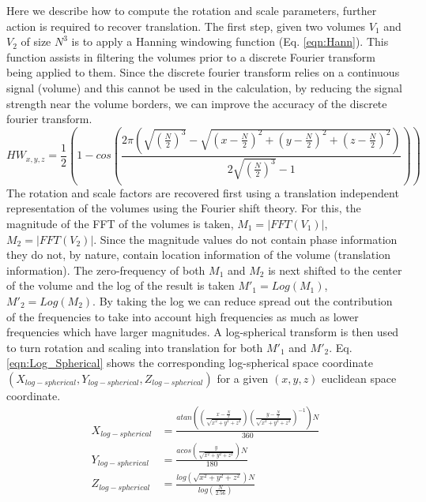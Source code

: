 Here we describe how to compute the rotation and scale parameters, further action is required to recover translation. The first step, given two volumes $V_1$ and $V_2$ of size $N^3$ is to apply a Hanning windowing function (Eq. \ref{eqn:Hann}). This function assists in filtering the volumes prior to a discrete Fourier transform being applied to them. Since the discrete fourier transform relies on a continuous signal (volume) and this cannot be used in the calculation, by reducing the signal strength near the volume borders, we can improve the accuracy of the discrete fourier transform.
\begin{equation} \label{eqn:Hann}
\scriptstyle
HW_{x,y,z} = \frac{1}{2}\left(
1 - cos \left(
\frac{2\pi
\left(
\sqrt{\left(\frac{N}{2}\right)^3} -
\sqrt{
\left(x-\frac{N}{2}\right)^2 + \left(y-\frac{N}{2}\right)^2 + \left(z-\frac{N}{2}\right)^2
}
\right)
}
{2\sqrt{\left(\frac{N}{2}\right)^3} - 1}
\right)
\right)
\end{equation}
The rotation and scale factors are recovered first using a translation independent representation of the volumes using the Fourier shift theory. For this, the magnitude of the FFT of the volumes is taken, $M_1 = |FFT(V_1)|$, $M_2 = |FFT(V_2)|$. Since the magnitude values do not contain phase information they do not, by nature, contain location information of the volume (translation information). The zero-frequency of both $M_1$ and $M_2$ is next shifted to the center of the volume and the log of the result is taken $M'_1 = Log(M_1)$, $M'_2 = Log(M_2)$. By taking the log we can reduce spread out the contribution of the frequencies to take into account high frequencies as much as lower frequencies which have larger magnitudes. A log-spherical transform is then used to turn rotation and scaling into translation for both $M'_1$ and $M'_2$. Eq. \ref{eqn:Log_Spherical} shows the corresponding log-spherical space coordinate $(X_{log-spherical}, Y_{log-spherical}, Z_{log-spherical})$ for a given $(x,y,z)$ euclidean space coordinate.
\begin{equation} \label{eqn:Log_Spherical}
\begin{split}
X_{log-spherical} & = \frac{atan\left(
\left(\frac{x-\frac{N}{2}}{\sqrt{x^2+y^2+z^2}}\right)
\left(\frac{y-\frac{N}{2}}{\sqrt{x^2+y^2+z^2}}\right)^{-1}
\right)N}{360}\\
Y_{log-spherical} & = \frac{acos\left(
\frac{y}{\sqrt{x^2+y^2+z^2}}
\right)N}
{180} \\
Z_{log-spherical} & =\frac{log\left(\sqrt{x^2+y^2+z^2}\right)N}{log\left( \frac{N}{2.56} \right)} \\
\end{split}
\end{equation}
